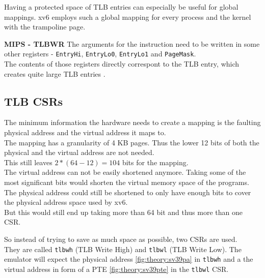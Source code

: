 Having a protected space of TLB entries can especially be useful for global mappings. xv6 employs such a global
mapping for every process and the kernel with the trampoline page.

\textbf{MIPS - TLBWR} The arguments for the instruction need to be written in some
other registers - \texttt{EntryHi}, \texttt{EntryLo0}, \texttt{EntryLo1} and \texttt{PageMask}.\\
The contents of those registers directly correspont to the TLB entry, which creates quite large
TLB entries \cite{heiserAnatomyHighPerformanceMicrokernel}.



\subsection{TLB CSRs}
The minimum information the hardware needs to create a mapping is the faulting physical address and
the virtual address it maps to.\\
The mapping has a granularity of 4 KB pages. Thus the lower 12 bits of both the physical and the
virtual address are not needed.\\
This still leaves $2*(64-12)=104$ bits for the mapping.\\
The virtual address can not be easily shortened anymore. Taking some of the most significant bits
would shorten the virtual memory space of the programs.\\
The physical address could still be shortened to only have enough bits to cover the physical address
space used by xv6.\\
But this would still end up taking more than 64 bit and thus more than one CSR.

So instead of trying to save as much space as possible, two CSRs are used.\\
They are called \texttt{tlbwh} (TLB Write High) and \texttt{tlbwl} (TLB Write Low).
The emulator will expect the physical address \ref{fig:theory:sv39pa} in \texttt{tlbwh} and a the virtual address in form
of a PTE \ref{fig:theory:sv39pte} in the \texttt{tlbwl} CSR.




